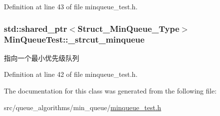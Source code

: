 Definition at line 43 of file minqueue\+\_\+test.\+h.

\hypertarget{class_min_queue_test_aed079eb9c6dd8460cc785b0fc6088a97}{}
\subsubsection[{\+\_\+strcut\+\_\+minqueue}]{\setlength{\rightskip}{0pt plus 5cm}std\+::shared\+\_\+ptr$<${\bf Struct\+\_\+\+Min\+Queue\+\_\+\+Type}$>$ Min\+Queue\+Test\+::\+\_\+strcut\+\_\+minqueue\hspace{0.3cm}{\ttfamily [protected]}}\label{class_min_queue_test_aed079eb9c6dd8460cc785b0fc6088a97}
指向一个最小优先级队列 

Definition at line 42 of file minqueue\+\_\+test.\+h.



The documentation for this class was generated from the following file\+:\begin{DoxyCompactItemize}
\item 
src/queue\+\_\+algorithms/min\+\_\+queue/\hyperlink{minqueue__test_8h}{minqueue\+\_\+test.\+h}\end{DoxyCompactItemize}

